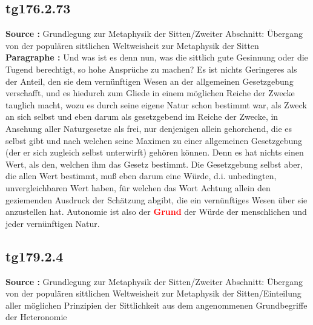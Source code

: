 \documentclass[a4paper,12pt,twoside]{book}
\newcommand{\match}[1]{\textcolor{red}{\textbf{#1}}}
\begin{document}
	\subsection*{tg176.2.73} 
	\textbf{Source : }Grundlegung zur Metaphysik der Sitten/Zweiter Abschnitt: Übergang von der populären sittlichen Weltweisheit zur Metaphysik der Sitten\\  
	
	\noindent\textbf{Paragraphe : }Und was ist es denn nun, was die sittlich gute Gesinnung oder die Tugend berechtigt, so hohe Ansprüche zu machen? Es ist nichts Geringeres als der Anteil, den sie dem vernünftigen Wesen an der allgemeinen Gesetzgebung verschafft, und es hiedurch zum Gliede in einem möglichen Reiche der Zwecke tauglich macht, wozu es durch seine eigene Natur schon bestimmt war, als Zweck an sich selbst und eben darum als gesetzgebend im Reiche der Zwecke, in Ansehung aller Naturgesetze als frei, nur denjenigen allein gehorchend, die es selbst gibt und nach welchen seine Maximen zu einer allgemeinen Gesetzgebung (der er sich zugleich selbst unterwirft) gehören können. Denn es hat nichts einen Wert, als den, welchen ihm das Gesetz bestimmt. Die Gesetzgebung selbst aber, die allen Wert bestimmt, muß eben darum eine Würde, d.i. unbedingten, unvergleichbaren Wert haben, für welchen das Wort Achtung allein den geziemenden Ausdruck der Schätzung abgibt, die ein vernünftiges Wesen über sie anzustellen hat. Autonomie ist also der \match{Grund} der Würde der menschlichen und jeder vernünftigen Natur. 
	
	\subsection*{tg179.2.4} 
	\textbf{Source : }Grundlegung zur Metaphysik der Sitten/Zweiter Abschnitt: Übergang von der populären sittlichen Weltweisheit zur Metaphysik der Sitten/Einteilung aller möglichen Prinzipien der Sittlichkeit aus dem angenommenen Grundbegriffe der Heteronomie\\  
	
\end{document}
